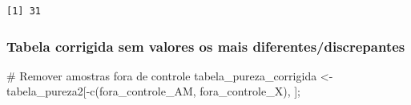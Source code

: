 \documentclass[
  letterpaper,
  DIV=11,
  numbers=noendperiod]{scrartcl}
\newenvironment{Shaded}{\begin{snugshade}}{\end{snugshade}}
\newcommand{\AttributeTok}[1]{\textcolor[rgb]{0.40,0.45,0.13}{#1}}
\newcommand{\CommentTok}[1]{\textcolor[rgb]{0.37,0.37,0.37}{#1}}
\newcommand{\ConstantTok}[1]{\textcolor[rgb]{0.56,0.35,0.01}{#1}}
\newcommand{\FunctionTok}[1]{\textcolor[rgb]{0.28,0.35,0.67}{#1}}
\newcommand{\NormalTok}[1]{\textcolor[rgb]{0.00,0.23,0.31}{#1}}
\newcommand{\OtherTok}[1]{\textcolor[rgb]{0.00,0.23,0.31}{#1}}
\newcommand{\SpecialCharTok}[1]{\textcolor[rgb]{0.37,0.37,0.37}{#1}}
\begin{document}
\begin{verbatim}
[1] 31
\end{verbatim}

\subsubsection{Tabela corrigida sem valores os mais
diferentes/discrepantes}\label{tabela-corrigida-sem-valores-os-mais-diferentesdiscrepantes}

\begin{Shaded}
\begin{Highlighting}[]
\CommentTok{\# Remover amostras fora de controle}
\NormalTok{tabela\_pureza\_corrigida }\OtherTok{\textless{}{-}}\NormalTok{ tabela\_pureza2[}\SpecialCharTok{{-}}\FunctionTok{c}\NormalTok{(fora\_controle\_AM, fora\_controle\_X), ];}
\end{Highlighting}
\end{Shaded}

\begin{Shaded}
\end{Shaded}
\end{document}
